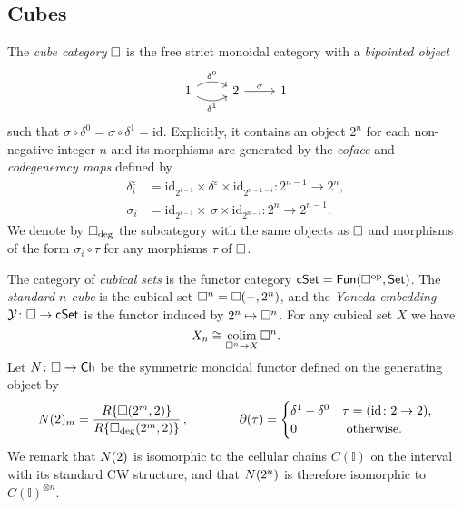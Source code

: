 
\subsection{Cubes}

The \textit{cube category} $\square$ is the free strict monoidal category with a \textit{bipointed object}
\begin{equation*}
\begin{tikzcd}
1 \arrow[r, bend left, "\delta^0"] \arrow[r, bend right, "\delta^1"'] & 2 \arrow[r, "\sigma"] & 1
\end{tikzcd}
\end{equation*}
such that $\sigma \circ \delta^0 = \sigma \circ \delta^1 = \mathrm{id}$. Explicitly, it contains an object $2^n$ for each non-negative integer $n$ and its morphisms are generated by the \textit{coface} and \textit{codegeneracy maps} defined by
\begin{align*}
\delta_i^\varepsilon & = \mathrm{id}_{2^{i-1}} \times \delta^\varepsilon \times \mathrm{id}_{2^{n-1-i}} \colon 2^{n-1} \to 2^n, \\
\sigma_i & = \mathrm{id}_{2^{i-1}} \times \, \sigma \times \mathrm{id}_{2^{n-i}} \colon 2^{n} \to 2^{n-1}.
\end{align*}
We denote by $\square_{\deg}$ the subcategory with the same objects as $\square$ and morphisms of the form $\sigma_i \circ \tau$ for any morphisms $\tau$ of $\square$.

The category of \textit{cubical sets} is the functor category $\mathsf{cSet} = \mathsf{Fun}(\square^{\mathrm{op}}, \mathsf{Set})$.
The \textit{standard $n$-cube} is the cubical set $\square^n = \square(-, 2^n)$, and the \textit{Yoneda embedding} $\mathcal{Y} \colon \square \to \mathsf{cSet}$ is the functor induced by $2^n \mapsto \square^n$.
For any cubical set $X$ we have
\begin{equation*}
X_n \cong \operatorname*{colim}_{\square^n \to X} \square^n.
\end{equation*}
Let $N \colon \square \to \mathsf{Ch}$ be the symmetric monoidal functor defined on the generating object by
\begin{equation*}
N(2)_m =
\frac{R\{\square(2^m, 2)\}}{R\{\square_{\deg}(2^m, 2)\}}\,,
\qquad \qquad
\partial (\tau) =
\begin{cases}
\delta^1 - \delta^0 & \tau  = (\mathrm{id} \colon 2 \to 2), \\
0 & \text{ otherwise}.
\end{cases}
\end{equation*}
We remark that $N(2)$ is isomorphic to the cellular chains $C(\mathbb I)$ on the interval with its standard CW structure, and that $N(2^n)$ is therefore isomorphic to $C(\mathbb I)^{\otimes n}$. 

